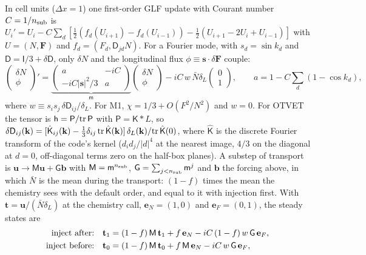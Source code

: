 \documentclass[11pt]{article}
\newcommand{\dx}{\Delta x}
\begin{document}
In cell units ($\dx=1$) one first-order GLF update with Courant number $C=1/n_{\rm sub}$ is
$U_i'=U_i-C\sum_d[\tfrac12(f_d(U_{i+1})-f_d(U_{i-1}))-\tfrac12(U_{i+1}-2U_i+U_{i-1})]$ with $U=(N,\mathbf F)$
and $f_d=(F_d,\mathsf D_{jd}N)$. For a Fourier mode, with $s_d=\sin k_d$ and
$\mathsf D=\mathsf I/3+\delta\mathsf D$, only $\delta N$ and the longitudinal flux
$\phi\equiv\mathbf s\cdot\delta\mathbf F$ couple:
\begin{equation}
\begin{pmatrix}\delta N\\\phi\end{pmatrix}'=
\underbrace{\begin{pmatrix}a&-iC\\-iC|\mathbf s|^2/3&a\end{pmatrix}}_{\mathsf m}
\begin{pmatrix}\delta N\\\phi\end{pmatrix}
-iC\,w\,\bar N\delta_L\begin{pmatrix}0\\1\end{pmatrix},
\qquad a=1-C\sum_d(1-\cos k_d),
\end{equation}
where $w\equiv s_is_j\,\delta\mathsf D_{ij}/\delta_L$. For M1, $\chi=1/3+O(F^2/N^2)$ and $w=0$. For OTVET
the tensor is $\mathsf h=\mathsf P/{\rm tr}\,\mathsf P$ with $\mathsf P=\mathsf K*L$, so
$\delta\mathsf D_{ij}(\mathbf k)=[\hat{\mathsf K}_{ij}(\mathbf k)-\tfrac13\delta_{ij}\,{\rm tr}\,\hat{\mathsf K}(\mathbf k)]\,
\delta_L(\mathbf k)/{\rm tr}\,\hat{\mathsf K}(0)$, where $\hat{\mathsf K}$ is the discrete Fourier transform of the code's
kernel ($d_id_j/|d|^4$ at the nearest image, $4/3$ on the diagonal at $d=0$, off-diagonal terms zero on the
half-box planes). A substep of transport is $\mathbf u\to\mathsf M\mathbf u+\mathsf G\mathbf b$ with
$\mathsf M=\mathsf m^{n_{\rm sub}}$, $\mathsf G=\sum_{j<n_{\rm sub}}\mathsf m^j$ and $\mathbf b$ the forcing
above, in which $\bar N$ is the mean during the transport: $(1-f)$ times the mean the chemistry sees with
the default order, and equal to it with injection first. With $\mathbf t=\mathbf u/(\bar N\delta_L)$ at the
chemistry call, $\mathbf e_N=(1,0)$ and $\mathbf e_F=(0,1)$, the steady states are
\begin{align}
\hbox{inject after:}\quad&\mathbf t_1=(1-f)\,\mathsf M\,\mathbf t_1+f\,\mathbf e_N-iC\,(1-f)\,w\,\mathsf G\,\mathbf e_F,\\
\hbox{inject before:}\quad&\mathbf t_0=(1-f)\,\mathsf M\,\mathbf t_0+f\,\mathsf M\,\mathbf e_N-iC\,w\,\mathsf G\,\mathbf e_F,
\end{align}
\end{document}
